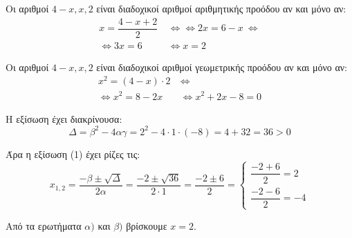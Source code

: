 
\begin{alist}
\item Οι αριθμοί $4 - x, x, 2$ είναι διαδοχικοί αριθμοί αριθμητικής προόδου αν και μόνο αν:
\begin{align*}
x = \dfrac{4 - x + 2}{2} \ &\Leftrightarrow
\Leftrightarrow 2x = 6 - x \ \Leftrightarrow \\
\Leftrightarrow 3x = 6 &\Leftrightarrow x = 2
\end{align*}

\item Οι αριθμοί $4 - x, x, 2$ είναι διαδοχικοί αριθμοί γεωμετρικής προόδου αν και μόνο αν:
\begin{align*}
x^2 = (4 - x) \cdot 2 \ &\Leftrightarrow \\
\Leftrightarrow x^2 = 8 - 2x \ &\Leftrightarrow x^2 + 2x - 8 = 0
\end{align*}

Η εξίσωση έχει διακρίνουσα:
\[\Delta = \beta^2 - 4\alpha\gamma = 2^2 - 4 \cdot 1 \cdot (-8) = 4 + 32 = 36 > 0\]

Άρα η εξίσωση (1) έχει ρίζες τις:
\[x_{1,2} = \dfrac{-\beta \pm \sqrt{\Delta}}{2\alpha} = \dfrac{-2 \pm \sqrt{36}}{2 \cdot 1} = \dfrac{-2 \pm 6}{2} = \begin{cases} \dfrac{-2 + 6}{2} = 2 \\ \dfrac{-2 - 6}{2} = -4 \end{cases}\]

\item Από τα ερωτήματα $\alpha)$ και $\beta)$ βρίσκουμε $x = 2$.
\end{alist}

